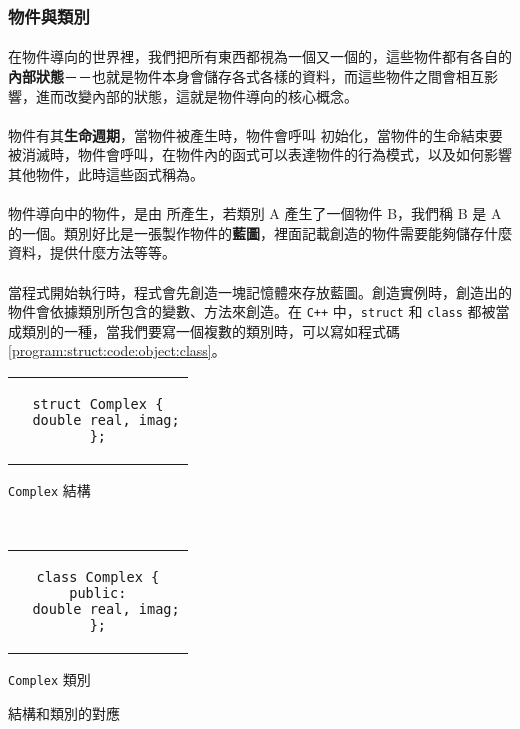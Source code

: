 \documentclass[12pt,a4paper,oneside]{report}
\begin{document}
\begin{CJK}{UTF8}{bkai}
\subsubsection{物件與類別}

\paragraph{}在物件導向的世界裡，我們把所有東西都視為一個又一個的，這些物件都有各自的\textbf{內部狀態}－－也就是物件本身會儲存各式各樣的資料，而這些物件之間會相互影響，進而改變內部的狀態，這就是物件導向的核心概念。
\paragraph{}物件有其\textbf{生命週期}，當物件被產生時，物件會呼叫 初始化，當物件的生命結束要被消滅時，物件會呼叫，在物件內的函式可以表達物件的行為模式，以及如何影響其他物件，此時這些函式稱為。
\paragraph{}物件導向中的物件，是由 所產生，若類別 A 產生了一個物件 B，我們稱 B 是 A 的一個。類別好比是一張製作物件的{\color{blue}\textbf{藍圖}}，裡面記載創造的物件需要能夠儲存什麼資料，提供什麼方法等等。
\paragraph{}當程式開始執行時，程式會先創造一塊記憶體來存放藍圖。創造實例時，創造出的物件會依據類別所包含的變數、方法來創造。在 \texttt{C++} 中，\lstinline!struct! 和 \lstinline!class! 都被當成類別的一種，當我們要寫一個複數的類別時，可以寫如程式碼 \ref{program:struct:code:object:class}。

\begin{code}[h!]
\centering
\begin{subcode}{.4\textwidth}
  \centering
  \begin{tabular}{c}
  \begin{lstlisting}
struct Complex {
  double real, imag;
};
  \end{lstlisting}
  \end{tabular}
  \caption{\texttt{Complex} 結構}
  \label{program:struct:code:object:class:1}
\end{subcode}
~
\begin{subcode}{.4\textwidth}
  \centering
  \begin{tabular}{c}
  \begin{lstlisting}
class Complex {
public:
  double real, imag;
};
  \end{lstlisting}
  \end{tabular}
  \caption{\texttt{Complex} 類別}
  \label{program:struct:code:object:class:2}
\end{subcode}
\caption{結構和類別的對應}
\label{program:struct:code:object:class}
\end{code}


\end{CJK}
\end{document}
